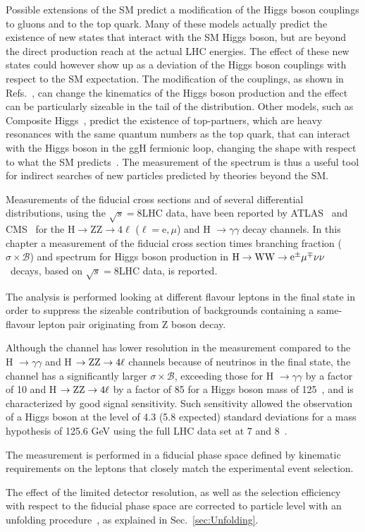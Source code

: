 Possible extensions of the SM predict a modification of the Higgs boson couplings to gluons and to the top quark. Many of these models actually predict the existence of new states that interact with the SM Higgs boson, but are beyond the direct production reach at the actual LHC energies. The effect of these new states could however show up as a deviation of the Higgs boson couplings with respect to the SM expectation. The modification of the couplings, as shown in Refs.~\cite{Azatov:2013xha,Harlander:2013oja}, can change the kinematics of the Higgs boson production and the effect can be particularly sizeable in the tail of the \pth distribution. 
Other models, such as Composite Higgs~\cite{Marzocca:2012zn}, predict the existence of top-partners, which are heavy resonances with the same quantum numbers as the top quark, that can interact with the Higgs boson in the ggH fermionic loop, changing the \pth shape with respect to what the SM predicts~\cite{Banfi:2013yoa}.
The measurement of the \pth spectrum is thus a useful tool for indirect searches of new particles predicted by theories beyond the SM.

Measurements of the fiducial cross sections and of several differential
distributions, using the $\sqrt{s}=8$\TeV LHC data, have been reported by ATLAS~\cite{Aad:2014tca,Aad:2014lwa,Aad:2015lha} and CMS~\cite{Khachatryan:2015rxa,Khachatryan:2015yvw} for the ${\mathrm{H} \to \mathrm{ZZ} \to 4\ell}$ ($\ell = \mathrm{e},\mu$) and H $\to \gamma\gamma$ decay channels. In this chapter a measurement of the fiducial cross section times branching fraction ($\sigma \times \mathcal{B}$) and \pt{} spectrum for Higgs boson production in \ensuremath{\mathrm{H}\rightarrow{}\WW\rightarrow \mathrm{e}^{\pm} \mu^{\mp}\nu\nu} ~decays, based on $\sqrt{s} = 8$\TeV LHC data, is reported.

The analysis is performed looking at different flavour leptons in the final state in order to suppress the sizeable contribution of backgrounds containing a same-flavour lepton pair originating from Z boson decay.

Although the \hwwllnn{} channel has lower resolution in the \pth{} measurement
compared to the H $\to \gamma\gamma$ and  H $\to \rm{ZZ}\to 4\ell$ channels
because of neutrinos in the final state, the channel has a significantly
larger $\sigma \times \mathcal{B}$, exceeding those for H $\to \gamma\gamma$ by a factor
of 10 and H $\to \rm{ZZ}\to 4\ell$ by a factor of 85 for a Higgs boson mass of
125\GeV~\cite{Heinemeyer:2013tqa}, and is characterized by good signal
sensitivity. Such sensitivity allowed the observation of a Higgs boson at the level of 4.3 (5.8 expected)
standard deviations for a mass hypothesis of 125.6 GeV using the full LHC data set at 7 and 8\TeV~\cite{Chatrchyan:2013iaa}.

The measurement is performed in a fiducial phase space defined by kinematic requirements on
the leptons that closely match the experimental event selection.

The effect of the limited detector resolution, as well as the
selection efficiency with respect to the fiducial phase space are corrected to
particle level with an unfolding procedure~\cite{Cowan:2002in}, as explained in Sec.~\ref{sec:Unfolding}.



